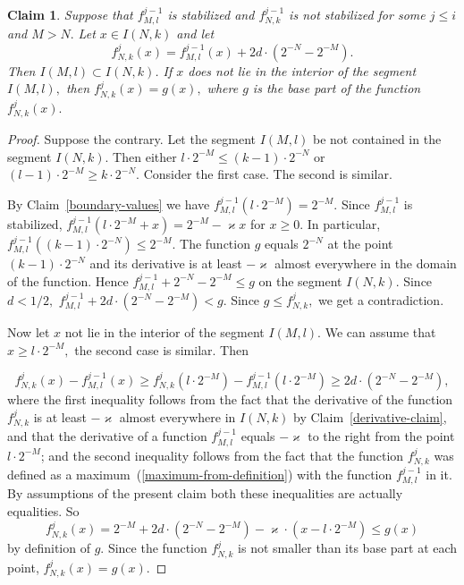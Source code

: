 \documentclass[12pt]{article}
\newtheorem{clai}[prop]{Claim}
\theoremstyle{definition}
\begin{document}
\begin{clai}
\label{influence-of-stabilized2}
Suppose that $f_{M, l}^{j-1}$ is stabilized and $f_{N,k}^{j-1}$  is not stabilized for some $j\le i$ and $M > N.$ Let $x\in I(N,k)$ and let
$$
f_{N,k}^j (x) =  f_{M,l}^{j-1}(x) + 2d\cdot \left(2^{-N} - 2^{-M}\right).
$$
Then $I(M,l)\subset I(N,k)$. If $x$ does not lie in the interior of the segment $I(M,l),$ then $f_{N,k}^j(x) = g(x),$ where $g$ is the base part of the function $f_{N,k}^j(x).$
\end{clai}

\begin{proof}
Suppose the contrary. Let the segment $I(M,l)$ be not contained in the segment $I(N,k).$ Then either  $l\cdot 2^{-M} \le (k-1)\cdot2^{-N}$ or $(l-1)\cdot2^{-M} \ge k\cdot 2^{-N}.$ Consider the first case. The second is similar.

By Claim~\ref{boundary-values} we have $f_{M,l}^{j-1} (l\cdot 2^{-M}) = 2^{-M}.$ Since  $f_{M,l}^{j-1}$ is stabilized, $f_{M,l}^{j-1} (l\cdot 2^{-M} + x) = 2^{-M} - \varkappa x$ for $x\ge0$. In particular, $f_{M,l}^{j-1} ((k-1)\cdot2^{-N})\le 2^{-M}.$ The function $g$ equals $2^{-N}$ at the point $(k-1)\cdot2^{-N}$ and its derivative is at least $-\varkappa$ almost everywhere in the domain of the function. Hence $f_{M,l}^{j-1}  + 2^{-N} - 2^{-M}\le g$ on the segment $I(N,k).$ Since $d<1/2,$ $f_{M,l}^{j-1}  + 2d\cdot\left(2^{-N} - 2^{-M}\right)< g.$ Since $g \le f_{N,k}^j,$ we get a contradiction.

Now let $x$ not lie in the interior of the segment $I(M,l).$ We can assume that $x\ge l\cdot2^{-M},$ the second case is similar. Then

$$
f_{N,k}^{j}(x) - f_{M,l}^{j-1}(x)\ge f_{N,k}^{j} (l\cdot 2^{-M}) - f_{M,l}^{j-1}(l\cdot 2^{-M}) \ge 2d\cdot\left(2^{-N} - 2^{-M}\right),
$$
where the first inequality follows from the fact that the derivative of the function $f_{N,k}^{j}$ is at least $-\varkappa$ almost everywhere in $I(N,k)$ by Claim~\ref{derivative-claim}, and that the derivative of a function $f_{M,l}^{j-1}$ equals $-\varkappa$ to the right from the point  $l\cdot 2^{-M}$; and the second inequality follows from the fact that the function $f_{N,k}^j$ was defined as a maximum~(\ref{maximum-from-definition}) with the function $f_{M,l}^{j-1}$ in it. By assumptions of the present claim both these inequalities are actually equalities. So
$$
f_{N,k}^{j}(x) = 2^{-M} + 2d\cdot\left(2^{-N} - 2^{-M}\right) - \varkappa\cdot\left(x-l\cdot2^{-M}\right) \le g(x)
$$
by definition of $g.$ Since the function $f_{N,k}^{j}$ is not smaller than its base part at each point, $f_{N,k}^{j}(x) = g(x).$
\end{proof}
\end{document}
